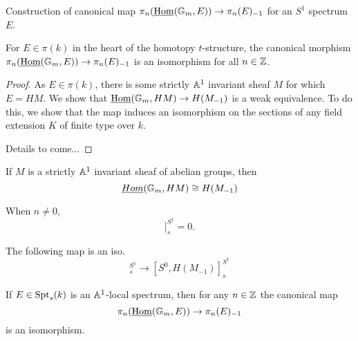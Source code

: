 \documentclass{amsart}%
\begin{document}
\begin{remark}
  Construction of canonical map
  $ \pi_n(\underline{\operatorname{Hom}}(\mathbb{G}_m,E)) \to \pi_n(E)_{-1}$ for an $S^1$
  spectrum $E$. 


\end{remark}

\begin{lemma}
  For $E \in \pi(k)$ in the heart of the homotopy $t$-structure, the
  canonical morphism
  $ \pi_n(\underline{\operatorname{Hom}}(\mathbb{G}_m,E)) \to \pi_n(E)_{-1}$ is an
  isomorphism for all $n \in \mathbb{Z}$. 
\end{lemma}

\begin{proof}
  As $E\in \pi(k)$, there is some strictly $\mathbb{A}^1$ invariant sheaf
  $M$ for which $E=HM$.  We show that
  $\underline{\operatorname{Hom}}(\mathbb{G}_m,HM)\to H(M_{-1})$ is a weak equivalence. To
  do this, we show that the map induces an isomorphism on the sections
  of any field extension $K$ of finite type over $k$. \cite[Cor
  4.2.8]{Mor03}

  Details to come...

\end{proof}

\begin{lemma}
  If $M$ is a strictly $\mathbb{A}^1$ invariant sheaf of abelian groups, then
  \begin{equation*}
    \underline{Hom}(\mathbb{G}_m, HM) \cong H(M_{-1})
  \end{equation*}
\end{lemma}

\begin{lemma}
When $n\neq 0$,
  \begin{equation}
    [\Sigma^{\infty}\bbG_m, HM[n]]_s^{S^1} = 0.
  \end{equation}

The following map is an iso. 
  \begin{equation}
    [\Sigma^{\infty}\bbG_m, HM]_s^{S^1} \to [S^0, H(M_{-1})]_s^{S^1}
  \end{equation}
\end{lemma}


\begin{proposition}
  If $E \in \mathrm{Spt}_s(k)$ is an $\mathbb{A}^1$-local spectrum, then for any
  $n \in \mathbb{Z}$ the canonical map
  \begin{equation*}
    \pi_n(\underline{\operatorname{Hom}}(\mathbb{G}_m,E)) \to \pi_n(E)_{-1}
  \end{equation*}
  is an isomorphism.
\end{proposition}
\end{document}
